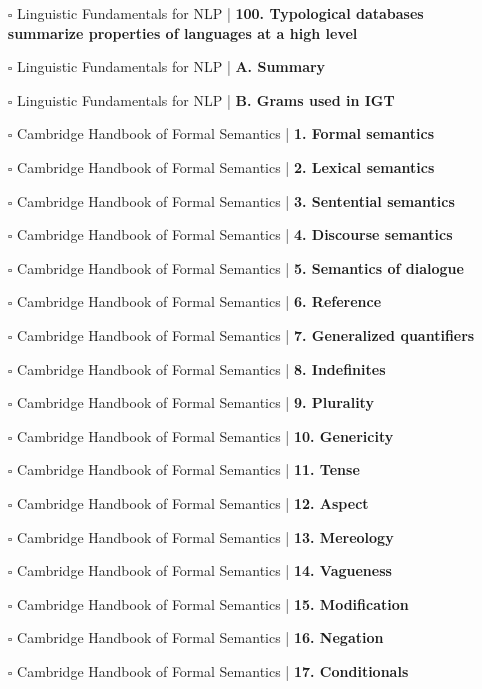 \documentclass[a4, landscape, 12pt]{article}
\newcommand{\checkbox}{$\square$}%
\begin{document}
\begin{itemize}
{}
\item [\checkbox]  Linguistic Fundamentals for NLP | \textbf{ 100. Typological databases summarize properties of languages at a high level
}
\item [\checkbox]  Linguistic Fundamentals for NLP | \textbf{ A. Summary
}
\item [\checkbox]  Linguistic Fundamentals for NLP | \textbf{ B. Grams used in IGT
}
\item [\checkbox]  Cambridge Handbook of Formal Semantics | \textbf{ 1. Formal semantics
}
\item [\checkbox]  Cambridge Handbook of Formal Semantics | \textbf{ 2. Lexical semantics
}
\item [\checkbox]  Cambridge Handbook of Formal Semantics | \textbf{ 3. Sentential semantics
}
\item [\checkbox]  Cambridge Handbook of Formal Semantics | \textbf{ 4. Discourse semantics
}
\item [\checkbox]  Cambridge Handbook of Formal Semantics | \textbf{ 5. Semantics of dialogue
}
\item [\checkbox]  Cambridge Handbook of Formal Semantics | \textbf{ 6. Reference
}
\item [\checkbox]  Cambridge Handbook of Formal Semantics | \textbf{ 7. Generalized quantifiers
}
\item [\checkbox]  Cambridge Handbook of Formal Semantics | \textbf{ 8. Indefinites
}
\item [\checkbox]  Cambridge Handbook of Formal Semantics | \textbf{ 9. Plurality
}
\item [\checkbox]  Cambridge Handbook of Formal Semantics | \textbf{ 10. Genericity
}
\item [\checkbox]  Cambridge Handbook of Formal Semantics | \textbf{ 11. Tense
}
\item [\checkbox]  Cambridge Handbook of Formal Semantics | \textbf{ 12. Aspect
}
\item [\checkbox]  Cambridge Handbook of Formal Semantics | \textbf{ 13. Mereology
}
\item [\checkbox]  Cambridge Handbook of Formal Semantics | \textbf{ 14. Vagueness
}
\item [\checkbox]  Cambridge Handbook of Formal Semantics | \textbf{ 15. Modification
}
\item [\checkbox]  Cambridge Handbook of Formal Semantics | \textbf{ 16. Negation
}
\item [\checkbox]  Cambridge Handbook of Formal Semantics | \textbf{ 17. Conditionals
}
\end{itemize}
\end{document}
